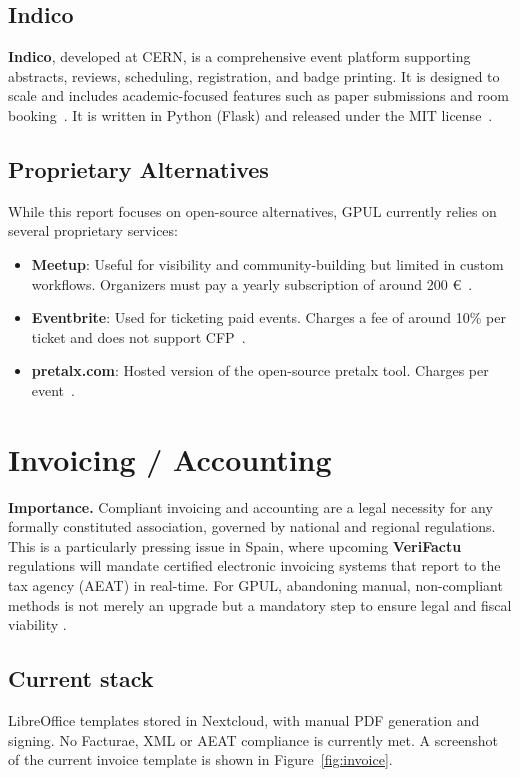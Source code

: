 \subsection*{Indico}
\textbf{Indico}, developed at CERN, is a comprehensive event platform supporting abstracts, reviews, scheduling, registration, and badge printing. It is designed to scale and includes academic-focused features such as paper submissions and room booking~\cite{indico-github}. It is written in Python (Flask) and released under the MIT license~\cite{indico-faq}.

\subsection*{Proprietary Alternatives}
While this report focuses on open-source alternatives, GPUL currently relies on several proprietary services:

\begin{itemize}
  \item \textbf{Meetup}: Useful for visibility and community-building but limited in custom workflows. Organizers must pay a yearly subscription of around 200 €~\cite{meetup-wiki}.
  \item \textbf{Eventbrite}: Used for ticketing paid events. Charges a fee of around 10\% per ticket and does not support CFP~\cite{eventbrite-wiki}.
  \item \textbf{pretalx.com}: Hosted version of the open-source pretalx tool. Charges per event~\cite{pretalx-pricing}.
\end{itemize}

\section{Invoicing / Accounting}

\textbf{Importance.} Compliant invoicing and accounting are a legal necessity for any formally constituted association, governed by national and regional regulations. This is a particularly pressing issue in Spain, where upcoming \textbf{VeriFactu} regulations will mandate certified electronic invoicing systems that report to the tax agency (AEAT) in real-time. For GPUL, abandoning manual, non-compliant methods is not merely an upgrade but a mandatory step to ensure legal and fiscal viability \cite{odoo-blog-verifactu}.

\subsection*{Current stack}
LibreOffice templates stored in Nextcloud, with manual PDF generation and signing. No Facturae, XML or AEAT compliance is currently met. A screenshot of the current invoice template is shown in Figure~\ref{fig:invoice}.

